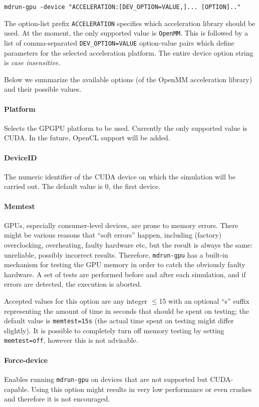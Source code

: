{\small {\tt mdrun-gpu -device "ACCELERATION:[DEV_OPTION=VALUE,]... [OPTION].."}}

The option-list prefix {\tt ACCELERATION} specifies which 
acceleration library should be used. At the moment, the only supported value 
is {\tt OpenMM}. This is followed by a list of comma-separated
{\tt DEV_OPTION=VALUE} option-value pairs which define 
parameters for the selected acceleration platform. The entire device option 
string is \emph{case insensitive}.

Below we summarize the available options (of the OpenMM acceleration library)
and their possible values.

\paragraph{Platform} Selects the GPGPU platform to be used. Currently the only 
supported value is CUDA.  In the future, OpenCL support will be added.

\paragraph{DeviceID} The numeric identifier of the CUDA device on which the 
simulation will be carried out. The default value is 0, {\ie} the first device. 

\paragraph{Memtest} GPUs, especially consumer-level devices, 
are prone to memory errors. There might be various reasons that 
``soft errors'' happen, including (factory) overclocking, overheating, 
faulty hardware etc, but the result is always the same: unreliable, possibly 
incorrect results. Therefore, {\tt mdrun-gpu} has a built-in mechanism for 
testing the GPU memory in order to catch the obviously faulty hardware. 
A set of tests are performed before and after each simulation, and if
errors are detected, the execution is aborted. 

Accepted values for this option are any integer $\leq$15 with an optional ``s'' 
suffix representing the amount of time in seconds that should be spent 
on testing; the default value is {\tt memtest=15s} (the actual time spent 
on testing might differ slightly).
It is possible to completely turn off memory testing by setting 
{\tt memtest=off}, however this is not advisable.

\paragraph{Force-device} Enables running {\tt mdrun-gpu} on
devices that are not supported but CUDA-capable. Using 
this option might results in very low performance or even 
crashes and therefore it is not encouraged.

